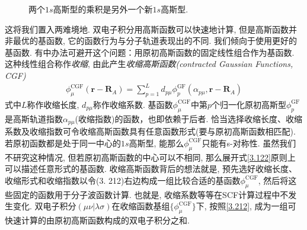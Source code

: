 \begin{figure}[h]\centering
	\def\FunctionA(x){
		3*sqrt(3)*exp(-9*x^2)*(2/3.1415)^(3/4)}
	\def\FunctionB(x){
		(4*2^(1/4))*(e^(-4*(-0.5+x)^2))/3.1415^(3/4)
	}
	\def\FunctionC(x){
		\FunctionB(x)*\FunctionA(x)/4.5
	}
	\caption{两个$1s$高斯型的乘积是另外一个新$1s$高斯型.}
	\label{f3.1}
\end{figure}
这将我们置入两难境地. 
双电子积分用高斯函数可以快速地计算, 
但是高斯函数并非最优的基函数, 
它的函数行为与分子轨道表现出的不同. 
我们倾向于使用更好的基函数. 
有中办法可避开这个问题：用原初高斯函数的固定线性组合作为基函数. 
这种线性组合称作\emph{收缩}, 
由此产生\emph{收缩高斯函数(contracted Gaussian Functions, CGF)}
\begin{align}
	\label{3.212}
	\phi_\mu^{\mathrm{CGF}}(\mathbf{r-R}_A) = \sum_{p=1}^{L}d_{p\mu}\phi_p^\mathrm{GF}(\alpha_{p\mu},\mathbf{r-R}_{A})
\end{align} 
式中$L$称作收缩长度, 
$d_{p\mu}$称作收缩系数. 
基函数$\phi_\mu^\mathrm{CGF}$中第$p$个归一化原初高斯型$\phi_p^\mathrm{GF}$是高斯轨道指数$\alpha_{p\mu}$(收缩指数)的函数，也即依赖于后者. 
恰当选择收缩长度、收缩系数及收缩指数可令收缩高斯函数具有任意函数形式(要与原初高斯函数相匹配). 
若原初函数都是处于同一中心的$1s$高斯型, 
能那么$\phi_\mu^\mathrm{CGF}$只能有s-对称性. 
虽然我们不研究这种情况, 
但若原初高斯函数的中心可以不相同, 
那么展开式\eqref{3.122}原则上可以描述任意形式的基函数. 
收缩高斯函数背后的想法就是, 
预先选好收缩长度、收缩形式和收缩指数以令(3.
212)右边构成一组比较合适的基函数$\phi_\mu^\mathrm{CGF}$, 
然后将这些固定的函数用于分子波函数计算. 
也就是, 
收缩系数等等在SCF计算过程中不发生变化. 
双电子积分$(\mu\nu|\lambda\sigma)$在收缩函数基组$\{\phi_\mu^\mathrm{CGF}\}$下, 
按照\eqref{3.212}, 
成为一组可快速计算的由原初高斯函数构成的双电子积分之和. 



